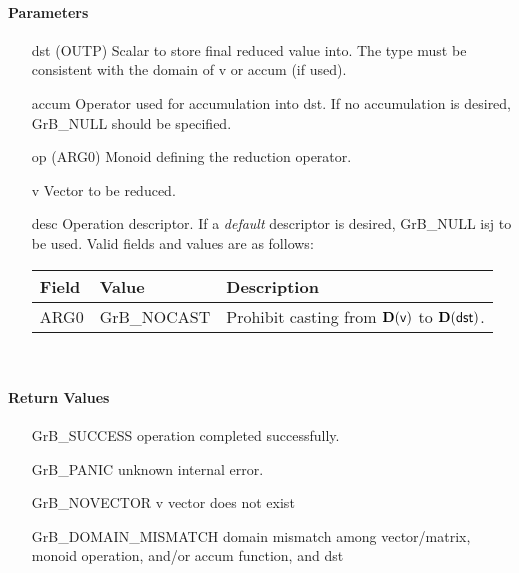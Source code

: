 \paragraph{Parameters}

\begin{itemize}[leftmargin=1.1in]
    \item[{\sf dst}]    ({\sf OUTP}) Scalar to store final reduced value into.  The type must be
                        consistent with the domain of {\sf v} or {\sf accum} (if used).

    \item[{\sf accum}]  Operator used for accumulation into {\sf dst}.  If no accumulation
                        is desired, {\sf GrB\_NULL} should be specified.

    \item[{\sf op}]     ({\sf ARG0}) Monoid defining the reduction operator.
    \item[{\sf v}]    Vector to be reduced.

    \item[{\sf desc}]   Operation descriptor. If a
    \emph{default} descriptor is desired, {\sf GrB\_NULL} isj to be
    used.  Valid fields and values are as follows: \\
    \begin{tabular}{lll}
    Field  & Value & Description \\
    \hline
    {\sf ARG0} & {\sf GrB\_NOCAST} & Prohibit casting from $\bold{D}({\sf v})$ to 
    $\bold{D}({\sf dst})$.  \\
    \end{tabular}\\
\end{itemize}

\paragraph{Return Values}

\begin{itemize}[leftmargin=2.1in]
\item[{\sf GrB\_SUCCESS}]             operation completed successfully.
\item[{\sf GrB\_PANIC}]               unknown internal error.
\item[{\sf GrB\_NOVECTOR}]   {\sf v} vector does not exist
\item[{\sf GrB\_DOMAIN\_MISMATCH}]  
        domain mismatch among vector/matrix, monoid operation, and/or
        accum function, and {\sf dst} 
\end{itemize}

